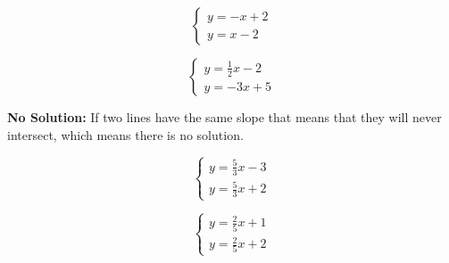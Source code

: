 \documentclass[11pt]{article}
\begin{document}
\begin{multicols}{2}

\begin{equation*}
	\begin{cases}
		y=-x+2\\
		y=x-2	
	\end{cases}
\end{equation*}

	
\begin{center}
\end{center}

\begin{equation*}
	\begin{cases}
		y=\frac{1}{2}x-2\\
		y=-3x+5	
	\end{cases}
\end{equation*}

	
\begin{center}
\end{center}

\end{multicols}
	
\pagebreak

\textbf{No Solution:} If two lines have the same slope that means that they will never intersect, which means there is no solution. 

\begin{multicols}{2}
\begin{equation*}
	\begin{cases}
			y=\frac{5}{3}x-3\\

			y=\frac{5}{3}x+2
	\end{cases}
\end{equation*}



\begin{equation*}
	\begin{cases}
			y=\frac{2}{5}x+1\\

			y=\frac{2}{5}x+2
	\end{cases}
\end{equation*}




\end{multicols}
\end{document}
